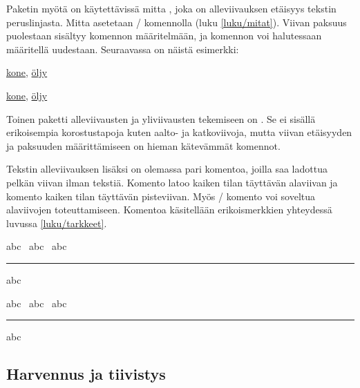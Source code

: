 \begin{koodilohkosis}
\usepackage[normalem]{ulem}
\end{koodilohkosis}

\noindent
Paketin  myötä on käytettävissä mitta ,
joka on alleviivauksen etäisyys tekstin peruslinjasta. Mitta asetetaan
\-/ komennolla (luku \ref{luku/mitat}). Viivan
paksuus puolestaan sisältyy komennon  määritelmään,
ja komennon voi halutessaan määritellä uudestaan. Seuraavassa on näistä
esimerkki:

\begin{koodilohkosis}
\setlength{\ULdepth}{.2ex}        %
\renewcommand{\ULthickness}{.1ex} %
\uline{kone}, \uline{öljy}
\end{koodilohkosis}

\begin{tulossis}
  \setlength{\ULdepth}{.2ex}
  \renewcommand{\ULthickness}{.1ex}
  \uline{kone}, \uline{öljy}
\end{tulossis}

\noindent
Toinen paketti alleviivausten ja yliviivausten tekemiseen on
. Se ei sisällä erikoisempia korostustapoja kuten
aalto- ja katkoviivoja, mutta viivan etäisyyden ja paksuuden
määrittämiseen on hieman kätevämmät komennot.

Tekstin alleviivauksen lisäksi on olemassa pari komentoa, joilla saa
ladottua pelkän viivan ilman tekstiä. Komento  latoo
kaiken tilan täyttävän alaviivan ja komento  kaiken
tilan täyttävän pisteviivan. Myös \-/ komento voi soveltua
alaviivojen toteuttamiseen. Komentoa käsitellään erikoismerkkien
yhteydessä luvussa \ref{luku/tarkkeet}.

\begin{koodilohkosis}
abc \hrulefill\ abc \dotfill\ abc \rule[-.3ex]{5em}{.4bp} abc
\end{koodilohkosis}

\begin{tulossis}
  abc \hrulefill\ abc \dotfill\ abc \rule[-.3ex]{5em}{.4bp} abc
\end{tulossis}

\subsection{Harvennus ja tiivistys}
\label{luku/korostus-harvennus}

